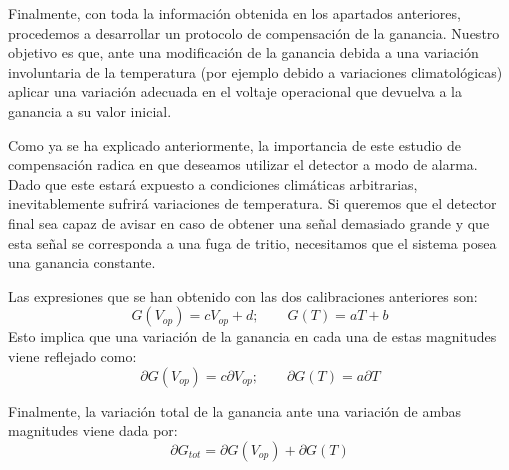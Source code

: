 Finalmente, con toda la información obtenida en los apartados anteriores, procedemos a desarrollar un protocolo de compensación de la ganancia. Nuestro objetivo es que, ante una modificación de la ganancia debida a una variación involuntaria de la temperatura (por ejemplo debido a variaciones climatológicas) aplicar una variación adecuada en el voltaje operacional que devuelva a la ganancia a su valor inicial.

Como ya se ha explicado anteriormente, la importancia de este estudio de compensación radica en que deseamos utilizar el detector  a modo de alarma. Dado que este estará expuesto a condiciones climáticas arbitrarias, inevitablemente sufrirá variaciones de temperatura. Si queremos que el detector final sea capaz de avisar en caso de obtener una señal demasiado grande y que esta señal se corresponda a una fuga de tritio, necesitamos que el sistema posea una ganancia constante.

Las expresiones que se han obtenido con las dos calibraciones anteriores son:
\begin{equation}
G(V_{op})=cV_{op}+d; \qquad G(T)=aT+b
\label{gananciatotal}
\end{equation}
Esto implica que una variación de la ganancia en cada una de estas magnitudes viene reflejado como:
\begin{equation}
\partial G(V_{op}) = c \partial V_{op}; \qquad \partial G(T) = a \partial T
\label{variacionparcialganancia}
\end{equation}

Finalmente, la variación total de la ganancia ante una variación de ambas magnitudes viene dada por:
\begin{equation}
\partial G_{tot} = \partial G(V_{op}) + \partial G(T)
\label{variaciontotalganancia}
\end{equation}

